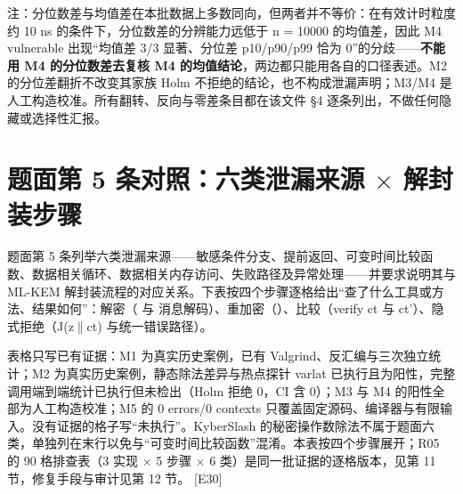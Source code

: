 \documentclass[UTF8,fontset=fandol,11pt,a4paper]{ctexart}
\begin{document}
\noindent 注：分位数差与均值差在本批数据上多数同向，但两者并不等价：在有效计时粒度约 10 ns 的条件下，分位数差的分辨能力远低于 n = 10000 的均值差，因此 M4 vulnerable 出现“均值差 3/3 显著、分位差 p10/p90/p99 恰为 0”的分歧——\textbf{不能用 M4 的分位数差去复核 M4 的均值结论}，两边都只能用各自的口径表述。M2 的分位差翻折不改变其家族 Holm 不拒绝的结论，也不构成泄漏声明；M3/M4 是人工构造校准。所有翻转、反向与零差条目都在该文件 §4 逐条列出，不做任何隐藏或选择性汇报。\par\endgroup\vspace{3mm}
\section{题面第 5 条对照：六类泄漏来源 \texorpdfstring{$\times$}{x} 解封装步骤}
题面第 5 条列举六类泄漏来源——敏感条件分支、提前返回、可变时间比较函数、数据相关循环、数据相关内存访问、失败路径及异常处理——并要求说明其与 ML-KEM 解封装流程的对应关系。下表按四个步骤逐格给出“查了什么工具或方法、结果如何”：解密（\texttt{} 与 \texttt{} 消息解码）、重加密（\texttt{}）、比较（verify ct 与 ct'）、隐式拒绝（J(z\texorpdfstring{$\|$}{||}ct) 与统一错误路径）。


表格只写已有证据：M1 为真实历史案例，已有 Valgrind、反汇编与三次独立统计；M2 为真实历史案例，静态除法差异与热点探针 varlat 已执行且为阳性，完整调用端到端统计已执行但未检出（Holm 拒绝 0，CI 含 0）；M3 与 M4 的阳性全部为人工构造校准；M5 的 0 errors/0 contexts 只覆盖固定源码、编译器与有限输入。没有证据的格子写“未执行”。KyberSlash 的秘密操作数除法不属于题面六类，单独列在末行以免与“可变时间比较函数”混淆。本表按四个步骤展开；R05 的 90 格排查表（3 实现 \texorpdfstring{$\times$}{x} 5 步骤 \texorpdfstring{$\times$}{x} 6 类）是同一批证据的逐格版本，见第 11 节，修复手段与审计见第 12 节。 [E30]
\end{document}
